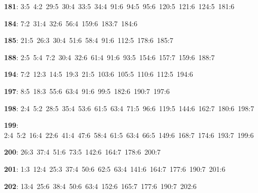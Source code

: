 \noindent \textbf{181}: 3:5\allowbreak\ 4:2\allowbreak\ 29:5\allowbreak\ 30:4\allowbreak\ 33:5\allowbreak\ 34:4\allowbreak\ 91:6\allowbreak\ 94:5\allowbreak\ 95:6\allowbreak\ 120:5\allowbreak\ 121:6\allowbreak\ 124:5\allowbreak\ 181:6\par
\noindent \textbf{184}: 7:2\allowbreak\ 31:4\allowbreak\ 32:6\allowbreak\ 56:4\allowbreak\ 159:6\allowbreak\ 183:7\allowbreak\ 184:6\par
\noindent \textbf{185}: 21:5\allowbreak\ 26:3\allowbreak\ 30:4\allowbreak\ 51:6\allowbreak\ 58:4\allowbreak\ 91:6\allowbreak\ 112:5\allowbreak\ 178:6\allowbreak\ 185:7\par
\noindent \textbf{188}: 2:5\allowbreak\ 5:4\allowbreak\ 7:2\allowbreak\ 30:4\allowbreak\ 32:6\allowbreak\ 61:4\allowbreak\ 91:6\allowbreak\ 93:5\allowbreak\ 154:6\allowbreak\ 157:7\allowbreak\ 159:6\allowbreak\ 188:7\par
\noindent \textbf{194}: 7:2\allowbreak\ 12:3\allowbreak\ 14:5\allowbreak\ 19:3\allowbreak\ 21:5\allowbreak\ 103:6\allowbreak\ 105:5\allowbreak\ 110:6\allowbreak\ 112:5\allowbreak\ 194:6\par
\noindent \textbf{197}: 8:5\allowbreak\ 18:3\allowbreak\ 55:6\allowbreak\ 63:4\allowbreak\ 91:6\allowbreak\ 99:5\allowbreak\ 182:6\allowbreak\ 190:7\allowbreak\ 197:6\par
\noindent \textbf{198}: 2:4\allowbreak\ 5:2\allowbreak\ 28:5\allowbreak\ 35:4\allowbreak\ 53:6\allowbreak\ 61:5\allowbreak\ 63:4\allowbreak\ 71:5\allowbreak\ 96:6\allowbreak\ 119:5\allowbreak\ 144:6\allowbreak\ 162:7\allowbreak\ 180:6\allowbreak\ 198:7\par
\noindent \textbf{199}: 2:4\allowbreak\ 5:2\allowbreak\ 16:4\allowbreak\ 22:6\allowbreak\ 41:4\allowbreak\ 47:6\allowbreak\ 58:4\allowbreak\ 61:5\allowbreak\ 63:4\allowbreak\ 66:5\allowbreak\ 149:6\allowbreak\ 168:7\allowbreak\ 174:6\allowbreak\ 193:7\allowbreak\ 199:6\par
\noindent \textbf{200}: 26:3\allowbreak\ 37:4\allowbreak\ 51:6\allowbreak\ 73:5\allowbreak\ 142:6\allowbreak\ 164:7\allowbreak\ 178:6\allowbreak\ 200:7\par
\noindent \textbf{201}: 1:3\allowbreak\ 12:4\allowbreak\ 25:3\allowbreak\ 37:4\allowbreak\ 50:6\allowbreak\ 62:5\allowbreak\ 63:4\allowbreak\ 141:6\allowbreak\ 164:7\allowbreak\ 177:6\allowbreak\ 190:7\allowbreak\ 201:6\par
\noindent \textbf{202}: 13:4\allowbreak\ 25:6\allowbreak\ 38:4\allowbreak\ 50:6\allowbreak\ 63:4\allowbreak\ 152:6\allowbreak\ 165:7\allowbreak\ 177:6\allowbreak\ 190:7\allowbreak\ 202:6\par
